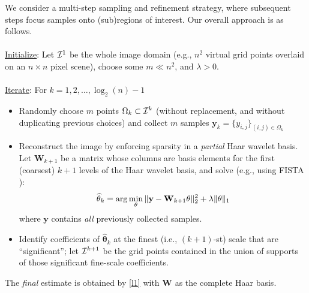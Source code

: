 \documentclass[landscape,final,a0paper,fontscale=0.33]{baposter}
\begin{document}
\begin{poster}
{{\noindent We consider a multi-step sampling and refinement strategy, where subsequent steps focus samples onto (sub)regions of interest. Our overall approach is as follows. \\
\\
\underline{Initialize}: Let ${\cal I}^1$ be the whole image domain (e.g., $n^2$ virtual grid points overlaid on an $n\times n$ pixel scene), choose some $m \ll n^2$, and $\lambda > 0$.\\
\\
\underline{Iterate}: For $k=1,2,\dots,\log_2(n)-1$
\begin{itemize}
\item Randomly choose $m$ points $\Omega_k \subset {\cal I}^k$ (without replacement, and without duplicating previous choices) and collect $m$ samples $\mathbf{y}_k = \{y_{i,j}\}_{(i,j)\in\Omega_k}$
\item Reconstruct the image by enforcing sparsity in a \emph{partial} Haar wavelet basis.  Let $\mathbf{W}_{k+ 1}$ be a matrix whose columns are basis elements for the first (coarsest) $k+1$ levels of the Haar wavelet basis, and solve (e.g., using FISTA \cite{beck2009fast}):\vspace{-0.3em} 
\begin{equation}\label{l1}
\hat{\mathbf{\theta}}_k = \arg \min_{\mathbf{\theta}} \|\mathbf{y} - \mathbf{W}_{k+1}\mathbf{\theta}\|_2^2 + \lambda \|\mathbf{\theta}\|_1  \vspace{-0.3em}
\end{equation}
 where $\mathbf{y}$ contains \emph{all} previously collected samples. 
\item Identify coefficients of $\hat{\mathbf{\theta}}_k$ at the finest (i.e., $(k+1)$-st) scale that are ``significant''; let ${\cal I}^{k+1}$ be the grid points contained in the union of supports of those significant fine-scale coefficients.    
\end{itemize}
The \emph{final} estimate is obtained by \eqref{l1} with $\mathbf{W}$ as the complete Haar basis.

          }
}


\end{poster}
\end{document}
